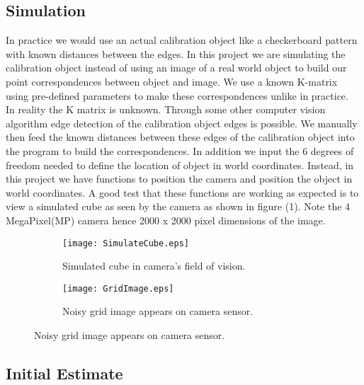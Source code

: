 \documentclass[titlepage]{article}
\begin{document}
\subsection{Simulation}
In practice we would use an actual calibration object like a checkerboard pattern with known distances between the edges.
In this project we are simulating the calibration object instead of using an image of a real world object to build our point correspondences between object and image. We use a known K-matrix using pre-defined parameters to make these correspondences unlike in practice.\\ 
In reality the K matrix is unknown. Through some other computer vision algorithm edge detection of the calibration object edges is possible. We manually then feed the known distances between these edges of the calibration object into the program to build the correspondences. In addition we input the 6 degrees of freedom needed to define the location of object in world coordinates. Instead, in this project we have functions to position the camera and position the object in world coordinates. A good test that these functions are working as expected is to view a simulated cube as seen by the camera as shown in figure (1). Note the 4 MegaPixel(MP) camera hence 2000 x 2000 pixel dimensions of the image.\\
\begin{figure}
\begin{subfigure}{0.5\textwidth}
\texttt{[image: SimulateCube.eps]}
\caption{Simulated cube in camera's field of vision.}
\label{wrap-fig:9}
\end{subfigure}
\begin{subfigure}{0.5\textwidth}
\texttt{[image: GridImage.eps]}
\caption{Noisy grid image appears on camera sensor.}
\label{noisy-grid}
\end{subfigure}
\end{figure}
%
\subsection{Initial Estimate}
\end{document}

